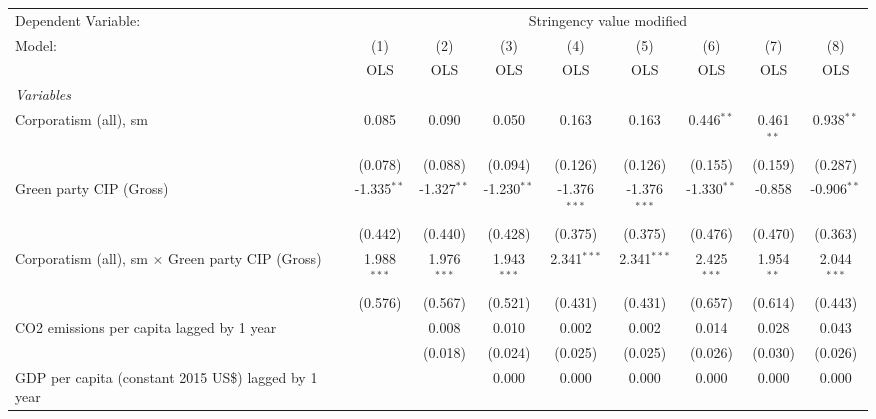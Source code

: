 
\begingroup
\centering
\begin{tabular}{lcccccccc}
   \toprule
   Dependent Variable: & \multicolumn{8}{c}{Stringency value modified}\\
   Model:                                                    & (1)           & (2)           & (3)           & (4)            & (5)            & (6)           & (7)          & (8)\\  
                                                             &  OLS          & OLS           & OLS           & OLS            & OLS            & OLS           & OLS          & OLS\\  
   \midrule
   \emph{Variables}\\
   Corporatism (all), sm                                     & 0.085         & 0.090         & 0.050         & 0.163          & 0.163          & 0.446$^{**}$  & 0.461$^{**}$ & 0.938$^{**}$\\   
                                                             & (0.078)       & (0.088)       & (0.094)       & (0.126)        & (0.126)        & (0.155)       & (0.159)      & (0.287)\\   
   Green party CIP (Gross)                                   & -1.335$^{**}$ & -1.327$^{**}$ & -1.230$^{**}$ & -1.376$^{***}$ & -1.376$^{***}$ & -1.330$^{**}$ & -0.858       & -0.906$^{**}$\\   
                                                             & (0.442)       & (0.440)       & (0.428)       & (0.375)        & (0.375)        & (0.476)       & (0.470)      & (0.363)\\   
   Corporatism (all), sm $\times$ Green party CIP (Gross)    & 1.988$^{***}$ & 1.976$^{***}$ & 1.943$^{***}$ & 2.341$^{***}$  & 2.341$^{***}$  & 2.425$^{***}$ & 1.954$^{**}$ & 2.044$^{***}$\\   
                                                             & (0.576)       & (0.567)       & (0.521)       & (0.431)        & (0.431)        & (0.657)       & (0.614)      & (0.443)\\   
   CO2 emissions per capita lagged by 1 year                 &               & 0.008         & 0.010         & 0.002          & 0.002          & 0.014         & 0.028        & 0.043\\   
                                                             &               & (0.018)       & (0.024)       & (0.025)        & (0.025)        & (0.026)       & (0.030)      & (0.026)\\   
   GDP per capita (constant 2015 US\$) lagged by 1 year      &               &               & 0.000         & 0.000          & 0.000          & 0.000         & 0.000        & 0.000\\   

\end{tabular}
